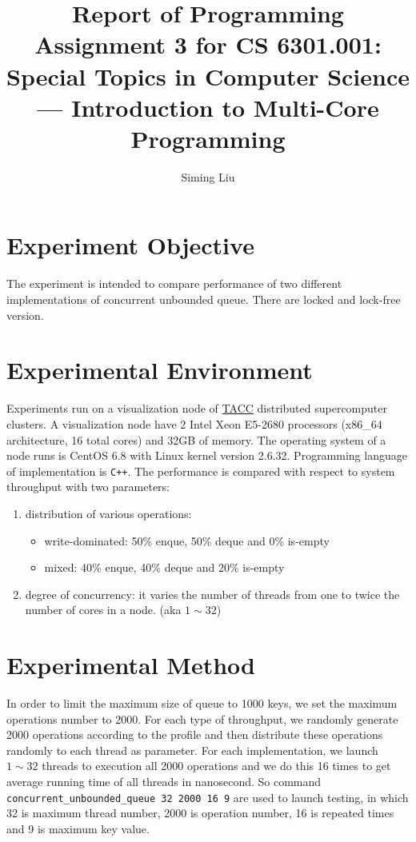 \documentclass[a4paper]{report}
\begin{document}
\title{Report of Programming Assignment 3 for CS 6301.001: Special Topics in Computer Science --- Introduction to Multi-Core Programming}

\author{Siming Liu}

\maketitle{}

\section*{Experiment Objective}
The experiment is intended to compare performance of two different implementations of concurrent unbounded queue. There are locked and lock-free version.

\section*{Experimental Environment}
Experiments run on a visualization node of \href{https://www.tacc.utexas.edu/}{TACC} distributed supercomputer clusters.
A visualization node have 2 Intel Xeon E5-2680 processors (x86\_64 architecture, 16 total cores) and 32GB of memory.
The operating system of a node runs is CentOS 6.8 with Linux kernel version 2.6.32.
Programming language of implementation is \lstinline{C++}.
The performance is compared with respect to system throughput with two parameters:
\begin{enumerate}
  \item distribution of various operations:
  \begin{itemize}
    \item write-dominated: 50\% enque, 50\% deque and 0\% is-empty
    \item mixed: 40\% enque, 40\% deque and 20\% is-empty
  \end{itemize}
  \item degree of concurrency: it varies the number of threads from one to twice the number of cores in a node. (aka $1 \sim 32$)
\end{enumerate}

\section*{Experimental Method}
In order to limit the maximum size of queue to 1000 keys, we set the maximum operations number to 2000.
For each type of throughput, we randomly generate 2000 operations according to the profile and then distribute these operations randomly to each thread as parameter. For each implementation, we launch $1 \sim 32$ threads to execution all 2000 operations and we do this 16 times to get average running time of all threads in nanosecond. So command \lstinline{concurrent_unbounded_queue 32 2000 16 9} are used to launch testing, in which 32 is maximum thread number, 2000 is operation number, 16 is repeated times and 9 is maximum key value.
\end{document}
